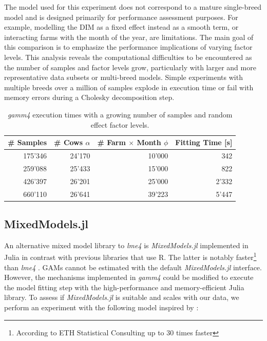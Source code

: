 The model used for this experiment does not correspond to a mature single-breed model and is designed primarily for performance assessment purposes. For example, modelling the DIM as a fixed effect instead as a smooth term, or interacting farms with the month of the year, are limitations. The main goal of this comparison is to emphasize the performance implications of varying factor levels. This analysis reveals the computational difficulties to be encountered as the number of samples and factor levels grow, particularly with larger and more representative data subsets or multi-breed models. Simple experiments with multiple breeds over a million of samples explode in execution time or fail with memory errors during a Cholesky decomposition step.

\begin{table}[H]
\centering
\begin{tabular}{r r r r}
\textbf{\# Samples} & \textbf{\# Cows} $\alpha$ & \textbf{\# Farm $\times$ Month} $\phi$ & \textbf{Fitting Time [s]} \\
\hline
\hline
175'346 & 24'170 & 10'000 & 342 \\
259'088 & 25'433 & 15'000 & 822 \\
426'397 & 26'201 & 25'000 & 2'332 \\
660'110 & 26'641 & 39'223 & 5'447\\
\end{tabular}
\captionsetup{width=0.65\linewidth}
\caption{\textit{gamm4} execution times with a growing number of samples and random effect factor levels.}\label{table:gamm4_performance}
\end{table}

\subsection{MixedModels.jl}
An alternative mixed model library to \textit{lme4} is \textit{MixedModels.jl} implemented in Julia in contrast with previous libraries that use R. The latter is notably faster\footnote{According to ETH Statistical Consulting up to 30 times faster} than \textit{lme4} \citep{markwick_fitting_2022}. GAMs cannot be estimated with the default \textit{MixedModels.jl} interface. However, the mechanisms implemented in \textit{gamm4} could be modified to execute the model fitting step with the high-performance and memory-efficient Julia library. To assess if \textit{MixedModels.jl} is suitable and scales with our data, we perform an experiment with the following model inspired by \cite{bryant_quantifying_2007}: 



